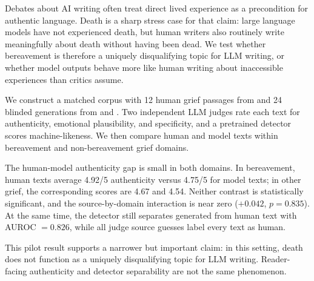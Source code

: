 Debates about AI writing often treat direct lived experience as a precondition for authentic language. Death is a sharp stress case for that claim: large language models have not experienced death, but human writers also routinely write meaningfully about death without having been dead. We test whether bereavement is therefore a uniquely disqualifying topic for LLM writing, or whether model outputs behave more like human writing about inaccessible experiences than critics assume.

We construct a matched corpus with 12 human grief passages from \aipsy and 24 blinded generations from \gptfive and \claudesonnet. Two independent LLM judges rate each text for authenticity, emotional plausibility, and specificity, and a pretrained \mage detector scores machine-likeness. We then compare human and model texts within bereavement and non-bereavement grief domains.

The human-model authenticity gap is small in both domains. In bereavement, human texts average 4.92/5 authenticity versus 4.75/5 for model texts; in other grief, the corresponding scores are 4.67 and 4.54. Neither contrast is statistically significant, and the source-by-domain interaction is near zero ($+0.042$, $p=0.835$). At the same time, the detector still separates generated from human text with AUROC $=0.826$, while all judge source guesses label every text as human.

This pilot result supports a narrower but important claim: in this setting, death does not function as a uniquely disqualifying topic for LLM writing. Reader-facing authenticity and detector separability are not the same phenomenon.
